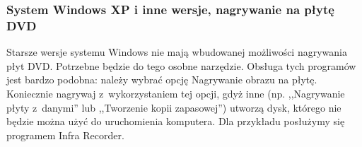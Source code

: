 \subsubsection{System Windows XP i inne wersje, nagrywanie na płytę DVD}
\begin{figure}
	\vspace{-10pt}
\end{figure}

Starsze wersje systemu Windows nie mają wbudowanej możliwości nagrywania płyt DVD. Potrzebne będzie do tego osobne narzędzie. Obsługa tych programów jest bardzo podobna: należy wybrać opcję \textcolor{ubuntu_orange}{Nagrywanie obrazu na płytę}. Koniecznie nagrywaj z~wykorzystaniem tej opcji, gdyż inne (np. ,,Nagrywanie płyty z~danymi'' lub ,,Tworzenie kopii zapasowej'') utworzą dysk, którego nie będzie można użyć do uruchomienia komputera. Dla przykładu posłużymy się programem Infra Recorder.

